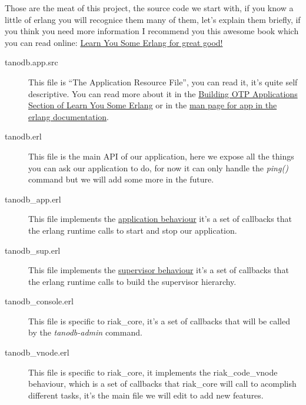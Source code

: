 \documentclass[letterpaper,10pt,english]{sphinxmanual}
\begin{document}
Those are the meat of this project, the source code we start with, if you
know a little of erlang you will recognice them many of them, let's explain them briefly,
if you think you need more information I recommend you this awesome book which
you can read online: \href{http://learnyousomeerlang.com/}{Learn You Some Erlang for great good!}
\begin{description}
\item[{tanodb.app.src}] \leavevmode
This file is ``The Application Resource File'', you can read it, it's quite self descriptive.
You can read more about it in the
\href{http://learnyousomeerlang.com/building-otp-applications}{Building OTP Applications Section of Learn You Some Erlang}
or in the \href{http://www.erlang.org/doc/man/app.html}{man page for app in the erlang documentation}.

\item[{tanodb.erl}] \leavevmode
This file is the main API of our application, here we expose all the things
you can ask our application to do, for now it can only handle the \emph{ping()}
command but we will add some more in the future.

\item[{tanodb\_app.erl}] \leavevmode
This file implements the \href{http://www.erlang.org/doc/design\_principles/applications.html}{application behaviour} it's a set of callbacks
that the erlang runtime calls to start and stop our application.

\item[{tanodb\_sup.erl}] \leavevmode
This file implements the \href{http://www.erlang.org/doc/design\_principles/sup\_princ.html}{supervisor behaviour} it's a set of callbacks
that the erlang runtime calls to build the supervisor hierarchy.

\item[{tanodb\_console.erl}] \leavevmode
This file is specific to riak\_core, it's a set of callbacks that will be
called by the \emph{tanodb-admin} command.

\item[{tanodb\_vnode.erl}] \leavevmode
This file is specific to riak\_core, it implements the riak\_code\_vnode
behaviour, which is a set of callbacks that riak\_core will call to
acomplish different tasks, it's the main file we will edit to add new
features.

\end{description}
\end{document}
